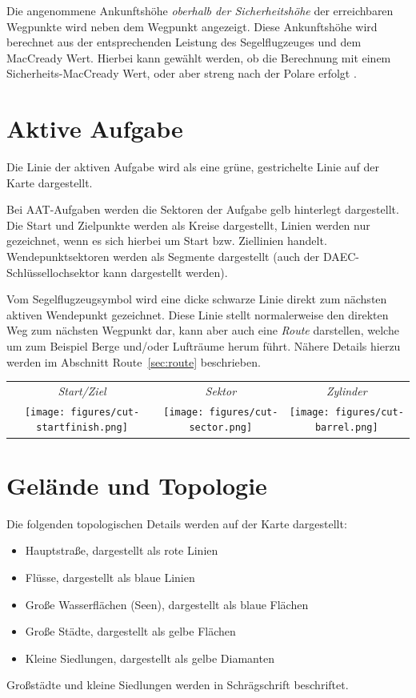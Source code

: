 Die angenommene Ankunftshöhe {\em oberhalb der Sicherheitshöhe} der erreichbaren  Wegpunkte wird neben dem Wegpunkt  angezeigt. Diese Ankunftshöhe wird berechnet aus der entsprechenden Leistung des Segelflugzeuges und dem MacCready Wert. Hierbei kann gewählt werden, ob die Berechnung mit einem Sicherheits-MacCready Wert, oder aber streng nach der Polare erfolgt .

\section{Aktive Aufgabe}

Die Linie der aktiven Aufgabe wird als eine grüne, gestrichelte Linie auf der Karte dargestellt.

Bei AAT-Aufgaben werden die Sektoren der Aufgabe gelb hinterlegt dargestellt.
Die Start und Zielpunkte werden als Kreise dargestellt, Linien werden nur gezeichnet, wenn es sich hierbei um Start bzw. Ziellinien handelt.
Wendepunktsektoren werden als Segmente dargestellt (auch der DAEC-Schlüssellochsektor kann dargestellt werden).

Vom Segelflugzeugsymbol wird eine dicke schwarze Linie direkt zum nächsten aktiven Wendepunkt gezeichnet. Diese Linie stellt normalerweise den direkten Weg zum nächsten Wegpunkt dar, kann aber auch eine {\em Route} darstellen, welche um zum Beispiel Berge und/oder Lufträume herum führt. Nähere Details hierzu werden im Abschnitt Route~\ref{sec:route}  beschrieben.
\begin{center}
\begin{tabular}{c c c}
{\it Start/Ziel} & {\it Sektor} & {\it Zylinder} \\
\texttt{[image: figures/cut-startfinish.png]} &
\texttt{[image: figures/cut-sector.png]} &
\texttt{[image: figures/cut-barrel.png]} \\
\end{tabular}
\end{center}

\section{Gelände und Topologie}

Die folgenden topologischen Details werden auf der Karte dargestellt:
\begin{itemize}
\item Hauptstraße, dargestellt als rote Linien
\item Flüsse, dargestellt als blaue Linien
\item Große Wasserflächen (Seen), dargestellt als blaue Flächen
\item Große Städte, dargestellt als gelbe Flächen
\item Kleine Siedlungen, dargestellt als gelbe Diamanten
\end{itemize}
Großstädte und kleine Siedlungen werden in Schrägschrift beschriftet.

